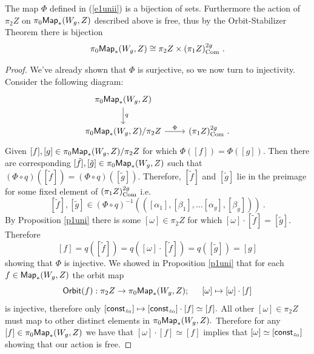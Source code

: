 \begin{prop}\label{prop.pizero}
The map $\Phi$ defined in (\ref{e1unii}) is a bijection of sets. Furthermore the action of $\pi_{2}Z$ on $\pi_{0}{\sf Map}_{\ast}(W_{g}, Z)$ described above is free, thus by the Orbit-Stabilizer Theorem there is bijection 
\[
\pi_{0}{\sf Map}_{\ast}(W_{g}, Z) \cong \pi_{2}Z \times (\pi_{1}Z)^{2g}_{\rm Com}~.
\]
\end{prop}
\begin{proof}
We've already shown that $\Phi$ is surjective, so we now turn to injectivity. Consider the following  diagram:
\[
\begin{tikzcd}
\pi_{0}{\sf Map}_{\ast}(W_{g}, Z) \arrow[d, "q"] & \\   
\pi_{0}{\sf Map}_{\ast}(W_{g}, Z)/\pi_{2}Z \arrow[r, "\Phi"]&  (\pi_{1}Z)^{2g}_{\rm Com}~.
\end{tikzcd}
\]
Given $[f], [g] \in \pi_{0}{\sf Map}_{\ast}(W_{g}, Z)/\pi_{2}Z$ for which $\Phi([f]) = \Phi([g]).$ 
Then there are corresponding $[\tilde{f}], [\tilde{g}] \in \pi_{0}{\sf Map}_{\ast}(W_{g}, Z)$ such that $(\Phi \circ q)([\tilde{f}]) = (\Phi \circ q)([\tilde{g}]).$ 
Therefore, $[\tilde{f}]$ and $[\tilde{g}]$ lie in the preimage for some fixed element of $(\pi_{1}Z)^{2g}_{\rm Com}$ i.e. 
\[
[\tilde{f}], [\tilde{g}] \in (\Phi \circ q)^{-1}(([\alpha_{1}], [\beta_{1}], \hdots [\alpha_{g}], [\beta_{g}]))~.\]
By Proposition \ref{p1uni} there is some $[\omega] \in \pi_{2}Z$ for which $[\omega] \cdot [\tilde{f}] = [\tilde{g}].$ Therefore 
\[
[f] = q([\tilde{f}]) = q([\omega] \cdot [\tilde{f}]) = q([\tilde{g}]) = [g]
\]
showing that $\Phi$ is injective.
\newline \newline
We showed in Proposition \ref{p1uni} that for each $f \in {\sf Map}_{\ast}(W_{g}, Z)$ the orbit map 
\[
{\sf Orbit}(f): \pi_{2}Z \rightarrow \pi_{0}{\sf Map}_{\ast}(W_{g}, Z); \hspace{15pt} [\omega] \mapsto [\omega] \cdot [f]
\]
is injective, therefore only $[{\sf const}_{z_{0}}] \mapsto [{\sf const}_{z_{0}}] \cdot [f] \simeq [f].$ All other $[\omega] \in \pi_{2}Z$ must map to other distinct elements in $\pi_{0}{\sf Map}_{\ast}(W_{g}, Z).$ Therefore for any $[f] \in \pi_{0}{\sf Map}_{\ast}(W_{g}, Z)$ we have that $[\omega] \cdot [f] \simeq [f]$ implies that $[\omega] \simeq [{\sf const}_{z_{0}}]$ showing that our action is free. 
\end{proof}

